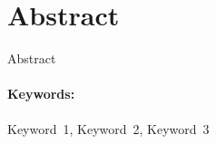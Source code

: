 \section*{\centering Abstract}\thispagestyle{plain}\label{abstract-en}
Abstract

\paragraph*{Keywords:} Keyword~1, Keyword~2, Keyword~3
\clearpage
